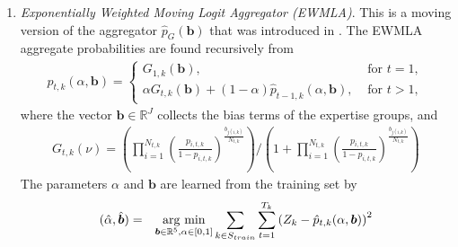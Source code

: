 \documentclass[aoas, preprint]{imsart}
\newcommand{\argmin}{\operatornamewithlimits{arg\ min}}
\numberwithin{equation}{section}
\theoremstyle{plain}
\newcommand{\R}{\mathbb{R}}
\begin{document}
\begin{enumerate}
\begin{enumerate}
 
\item  \textit{Exponentially Weighted Moving Logit Aggregator (EWMLA)}. This is a moving version of the aggregator $\hat{p}_G(\boldsymbol{b})$ that was introduced in \cite{satopaa}. 
%
The EWMLA aggregate probabilities are found recursively from
\begin{eqnarray*}
\hat{p}_{t,k}(\alpha, \boldsymbol{b}) =
\begin{cases}
G_{1,k}(\boldsymbol{b} ), & \text{ for } t  = 1, \\
\alpha G_{t,k}(\boldsymbol{b} )  + (1-\alpha) \hat{p}_{t-1,k}(\alpha, \boldsymbol{b}),  & \text{ for } t > 1,
\end{cases}
\end{eqnarray*}
where the vector $\boldsymbol{b} \in \mathbb{R}^J$ collects the bias terms of the expertise groups, and
\begin{eqnarray*}
G_{t,k}(\nu )  = \left( \prod\limits_{i=1}^{N_{t,k}} \left( \frac{p_{i, t, k}}{1-p_{i, t, k}} \right)^{ \frac{b_{j(i,k)}}{N_{t,k}}} \right) \Bigg/ \left(1+ \prod\limits_{i=1}^{N_{t,k}} \left( \frac{p_{i, t, k}}{1-p_{i, t, k}} \right)^{\frac{ b_{j(i,k)}}{N_{t,k}}} \right)
\end{eqnarray*}
\normalsize
The parameters $\alpha$ and $\boldsymbol{b}$ are learned from the training set by
\begin{eqnarray*}
(\hat{\alpha}, \hat{ \boldsymbol{b}}) &=& \argmin_{ \boldsymbol{b} \in \R^5, \alpha \in [0,1]} \sum_{k \in S_{train}} \sum_{t=1}^{T_k} \left(Z_k - \hat{p}_{t,k}(\alpha,  \boldsymbol{b})\right)^2
\end{eqnarray*}



\end{enumerate}
\end{enumerate}
\end{document}
